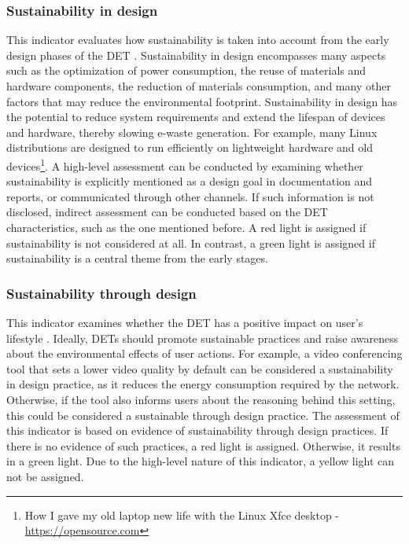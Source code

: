\subsubsection{Sustainability in design}
This indicator evaluates how sustainability is taken into account from the early design phases of the DET \cite{mankoff_environmental_2007}. Sustainability in design encompasses many aspects such as the optimization of power consumption, the reuse of materials and hardware components, the reduction of materials consumption, and many other factors that may reduce the environmental footprint. Sustainability in design has the potential to reduce system requirements and extend the lifespan of devices and hardware, thereby slowing e-waste generation. For example, many Linux distributions are designed to run efficiently on lightweight hardware and old devices\footnote{How I gave my old laptop new life with the Linux Xfce desktop - \href{https://opensource.com/article/22/6/linux-xfce-old-laptop}{https://opensource.com}}.
A high-level assessment can be conducted by examining whether sustainability is explicitly mentioned as a design goal in documentation and reports, or communicated through other channels. If such information is not disclosed, indirect assessment can be conducted based on the DET characteristics, such as the one mentioned before.
A red light is assigned if sustainability is not considered at all. In contrast, a green light is assigned if sustainability is a central theme from the early stages.

\subsubsection{Sustainability through design}
This indicator examines whether the DET has a positive impact on user's lifestyle \cite{mankoff_environmental_2007}. Ideally, DETs should promote sustainable practices and raise awareness about the environmental effects of user actions. For example, a video conferencing tool that sets a lower video quality by default can be considered a sustainability in design practice, as it reduces the energy consumption required by the network. Otherwise, if the tool also informs users about the reasoning behind this setting, this could be considered a sustainable through design practice.
The assessment of this indicator is based on evidence of sustainability through design practices. If there is no evidence of such practices, a red light is assigned. Otherwise, it results in a green light. Due to the high-level nature of this indicator, a yellow light can not be assigned.

